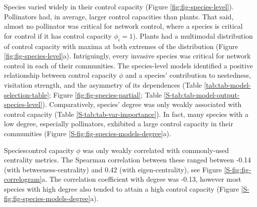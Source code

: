 \documentclass[a4paper]{artikel1}
\theoremstyle{definition}
\theoremstyle{definition}
\theoremstyle{definition}
\theoremstyle{remark}
\providecommand{\DIFaddtex}[1]{{\protect\color{blue}\uwave{#1}}} %
\providecommand{\DIFaddbegin}{} %
\providecommand{\DIFaddend}{} %
\providecommand{\DIFadd}[1]{\texorpdfstring{\DIFaddtex{#1}}{#1}} %
\begin{document}
Species varied widely in their control capacity (Figure
\ref{fig:fig-species-level}). Pollinators had, in average, larger
control capacities than plants. That said, almost no pollinator was
critical for network control, \DIFaddbegin \DIFadd{(}\DIFaddend where a species is critical for control
if it has control capacity \(\phi_i = 1\)). Plants had a multimodal
distribution of control capacity with maxima at both extremes of the
distribution (Figure \ref{fig:fig-species-level}a). Intriguingly, every
invasive species was critical for network control in each of their
communities. The species-level models identified a positive relationship
between control capacity \(\phi\) and a species' contribution to
nestedness, visitation strength, and the asymmetry of its dependences
(Table \ref{tab:tab-model-selection-table}; Figure
\ref{fig:fig-species-partial}; Table
\ref{S-tab:tab-model-output-species-level}). Comparatively, species'
degree was only weakly associated with control capacity (Table
\ref{S-tab:tab-var-importance}). In fact, many species with a low
degree, especially pollinators, exhibited a large control capacity in
their communities (Figure \ref{S-fig:fig-species-models-degree}a).

Species\DIFaddbegin \DIFadd{' }\DIFaddend control capacity \(\phi\) was only weakly correlated with
commonly-used centrality metrics. The Spearman correlation between these
ranged between -0.14 (with betweeness-centrality) and 0.42 (with
eigen-centrality), see Figure \ref{S-fig:fig-correlogram}a. The
correlation coefficient with degree was -0.13, however most species with
high degree also tended to attain a high control capacity (Figure
\ref{S-fig:fig-species-models-degree}a).
\end{document}
